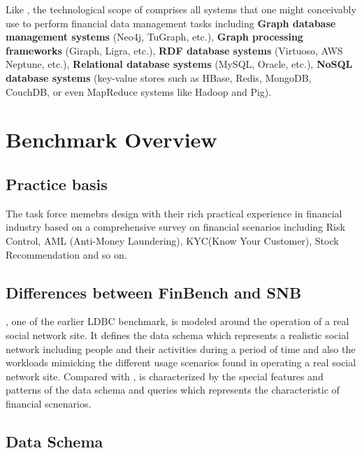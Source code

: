 Like \ldbcsnb, the technological scope of \ldbcfinbench comprises all systems that
one might conceivably use to perform financial data management tasks including
\textbf{Graph database management systems} (\eg Neo4j, TuGraph, etc.), \textbf{
    Graph processing frameworks} (\eg Giraph, Ligra, etc.), \textbf{RDF database
    systems} (\eg Virtuoso, AWS Neptune, etc.), \textbf{Relational database systems}
(\eg MySQL, Oracle, etc.), \textbf{NoSQL database systems} (\eg key-value stores
such as HBase, Redis, MongoDB, CouchDB, or even MapReduce systems like Hadoop
and Pig).


\section{Benchmark Overview}

\subsection{Practice basis}

The task force memebrs design \ldbcfinbench with their rich practical experience in
financial industry based on a comprehensive survey on financial scenarios including
Risk Control, AML (Anti-Money Laundering), KYC(Know Your Customer), Stock Recommendation
and so on.

\subsection{Differences between FinBench and SNB}

\ldbcsnb, one of the earlier LDBC benchmark, is modeled around the operation of a real social network site. It defines the data schema which represents a realistic social network including people and their activities during a period of time and also the workloads mimicking the different usage scenarios found in operating a real social network site. Compared with \ldbcsnb, \ldbcfinbench is characterized by the special features and patterns of the data schema and queries which represents the characteristic of financial scnenarios.

\subsection{Data Schema}

